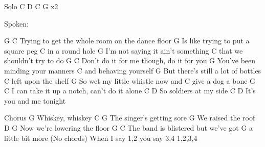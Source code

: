 \documentclass[11pt]{article}
\begin{document}
Solo
C D C G x2

Spoken:

G                            C
Trying to get the whole room on the
 dance floor
G
Is like trying to put a square peg
C
in a round hole
G
I’m not saying it ain’t something
        C
that we shouldn’t try to do
G                          C
Don’t do it for me though, do it for you
G
You’ve been minding your manners
    C
and behaving yourself
G
But there’s still a lot of bottles
     C
left upon the shelf
G
So wet my little whistle now and
C
give a dog a bone
G                         C
I can take it up a notch, can’t do it alone
   C              D
So soldiers at my side
     C          D
It’s you and me tonight

Chorus
G
Whiskey, whiskey
    C                G
The singer’s getting sore
G
We raised the roof
          D            G
Now we’re lowering the floor
G                               C
The band is blistered but we’ve got
              G
 a little bit more
(No chords)
When I say 1,2 you say 3,4
1,2,3,4
\clearpage
\end{document}
